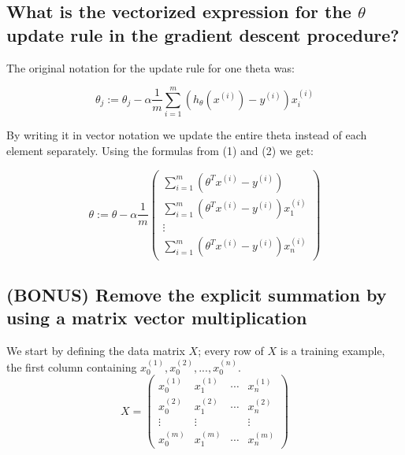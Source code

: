 \documentclass{article}
\begin{document}
\pagebreak

\subsection{What is the vectorized expression for the $\theta$ update rule in the gradient descent procedure?}
The original notation for the update rule for one theta was:

	\begin{equation*}
	\theta_j := \theta_j - \alpha \frac{1}{m}  \sum\limits_{i=1}^m (h _{\theta} (x ^{(i)}) - y ^{(i)})x_i^{(i)}
	\end{equation*}
	
	By writing it in vector notation we update the entire theta instead of each element separately. Using the formulas from (1) and (2) we get:
	
	\begin{equation*}
	\theta := \theta - \alpha \frac{1}{m}\begin{pmatrix}	\sum\limits_{i=1}^m ( \theta^T x^{(i)}  - y ^{(i)})\\ 
										     		\sum\limits_{i=1}^m ( \theta^T x^{(i)}  - y ^{(i)})x_1^{(i)} \\ 
											      	 \vdots \\
											 	\sum\limits_{i=1}^m ( \theta^T x^{(i)}  - y ^{(i)})x_n^{(i)}
							\end{pmatrix}
	\end{equation*}

\subsection{(BONUS) Remove the explicit summation by using a matrix vector multiplication}
We start by defining the data matrix $X$; every row of $X$ is a training example, the first column containing $x_0^{(1)}, x_0^{(2)}, ..., x_0^{(n)}$.\\

	\begin{equation*}
	X = \begin{pmatrix} 
		x_0^{(1)} & x_1^{(1)} & \cdots & x_n^{(1)} \\
		x_0^{(2)} & x_1^{(2)} & \cdots & x_n^{(2)} \\
		\vdots & \vdots & & \vdots \\
		x_0^{(m)} & x_1^{(m)} & \cdots & x_n^{(m)}
	     \end{pmatrix}
	\end{equation*}
	
\end{document}
